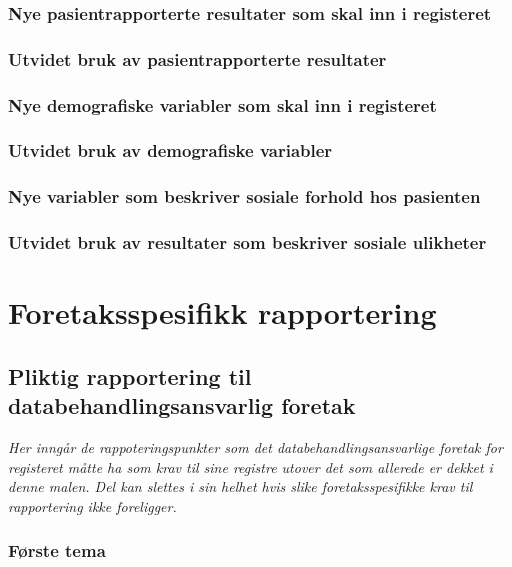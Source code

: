 \documentclass[norsk, a4paper, twocolumn]{report}
\begin{document}
\section{Nye pasientrapporterte resultater som skal inn i registeret}
\fyll

\section{Utvidet bruk av pasientrapporterte resultater}
\fyll

\section{Nye demografiske variabler som skal inn i registeret}
\fyll

\section{Utvidet bruk av demografiske variabler}
\fyll

\section{Nye variabler som beskriver sosiale forhold hos pasienten}
\fyll

\section{Utvidet bruk av resultater som beskriver sosiale ulikheter}
\fyll



\part{Foretaksspesifikk rapportering}\label{part:spe}
\chapter{Pliktig rapportering til databehandlingsansvarlig foretak}
\textit{Her inngår de rappoteringspunkter som det databehandlingsansvarlige
foretak for registeret måtte ha som krav til sine registre utover det som
allerede er dekket i denne malen. Del \ref{part:spe} kan slettes i sin helhet
hvis slike foretaksspesifikke krav til rapportering ikke foreligger.}

\section{Første tema}
\end{document}
